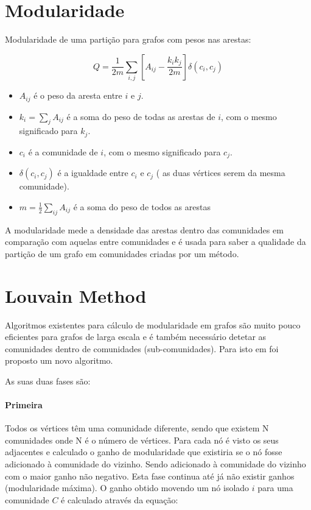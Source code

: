 
\renewcommand{\algorithmicrequire}{\textbf{Input: }}
\renewcommand{\algorithmicensure}{\textbf{Output: }}

\section{Modularidade}

Modularidade de uma partição para grafos com pesos nas arestas:

\begin{equation}
Q = \frac{1}{2m} \sum_{i,j} [ A_{ij} - \frac{k_i k_j}{2m} ] \delta(c_i ,c_j)
\label{eq:MN}
\end{equation}


\begin{itemize}
	\item $A_{ij}$ é o peso da aresta entre $i$ e $j$.
	\item $k_i = \sum_j A_{ij}$ é a soma do peso de todas as arestas de $i$, com o mesmo significado para $k_j$.
	\item $c_i$ é a comunidade de $i$, com o mesmo significado para $c_j$.
	\item $\delta(c_i,c_j)$ é a igualdade entre $c_i$ e $c_j$ ( as duas vértices serem da mesma comunidade).
	\item $m = \frac{1}{2}\sum_{ij} A_{ij}$ é a soma do peso de todos as arestas %
\end{itemize}

A modularidade mede a densidade das arestas dentro das comunidades em comparação com aquelas entre comunidades e é usada para saber a qualidade da partição de um grafo em comunidades criadas por um método. 


\section{Louvain Method}
Algoritmos existentes para cálculo de modularidade em grafos são muito pouco eficientes para grafos de larga escala e é também necessário detetar as comunidades dentro de comunidades (sub-comunidades). Para isto em \cite{louvainDoc} foi proposto um novo algoritmo.

As suas duas fases são:

\paragraph{Primeira}
Todos os vértices têm uma comunidade diferente, sendo que existem N comunidades onde N é o número de vértices.
Para cada nó é visto os seus adjacentes e calculado o ganho de modularidade que existiria se o nó fosse adicionado à comunidade do vizinho. Sendo adicionado à comunidade do vizinho com o maior ganho não negativo. Esta fase continua até já não existir ganhos (modularidade máxima).
O ganho obtido movendo um nó isolado $i$ para uma comunidade $C$ é calculado através da equação:


